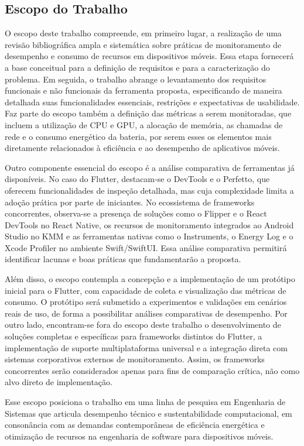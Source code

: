 \documentclass[12pt,a4paper]{article}
\begin{document}
\subsection{Escopo do Trabalho}
O escopo deste trabalho compreende, em primeiro lugar, a realização de uma revisão bibliográfica ampla e sistemática sobre práticas de monitoramento de desempenho e consumo de recursos em dispositivos móveis. Essa etapa fornecerá a base conceitual para a definição de requisitos e para a caracterização do problema. Em seguida, o trabalho abrange o levantamento dos requisitos funcionais e não funcionais da ferramenta proposta, especificando de maneira detalhada suas funcionalidades essenciais, restrições e expectativas de usabilidade. Faz parte do escopo também a definição das métricas a serem monitoradas, que incluem a utilização de CPU e GPU, a alocação de memória, as chamadas de rede e o consumo energético da bateria, por serem esses os elementos mais diretamente relacionados à eficiência e ao desempenho de aplicativos móveis.  

Outro componente essencial do escopo é a análise comparativa de ferramentas já disponíveis. No caso do Flutter, destacam-se o DevTools e o Perfetto, que oferecem funcionalidades de inspeção detalhada, mas cuja complexidade limita a adoção prática por parte de iniciantes. No ecossistema de frameworks concorrentes, observa-se a presença de soluções como o Flipper e o React DevTools no React Native, os recursos de monitoramento integrados ao Android Studio no KMM e as ferramentas nativas como o Instruments, o Energy Log e o Xcode Profiler no ambiente Swift/SwiftUI. Essa análise comparativa permitirá identificar lacunas e boas práticas que fundamentarão a proposta.  

Além disso, o escopo contempla a concepção e a implementação de um protótipo inicial para o Flutter, com capacidade de coleta e visualização das métricas de consumo. O protótipo será submetido a experimentos e validações em cenários reais de uso, de forma a possibilitar análises comparativas de desempenho. Por outro lado, encontram-se fora do escopo deste trabalho o desenvolvimento de soluções completas e específicas para frameworks distintos do Flutter, a implementação de suporte multiplataforma universal e a integração direta com sistemas corporativos externos de monitoramento. Assim, os frameworks concorrentes serão considerados apenas para fins de comparação crítica, não como alvo direto de implementação.  

Esse escopo posiciona o trabalho em uma linha de pesquisa em Engenharia de Sistemas que articula desempenho técnico e sustentabilidade computacional, em consonância com as demandas contemporâneas de eficiência energética e otimização de recursos na engenharia de software para dispositivos móveis.
\end{document}
